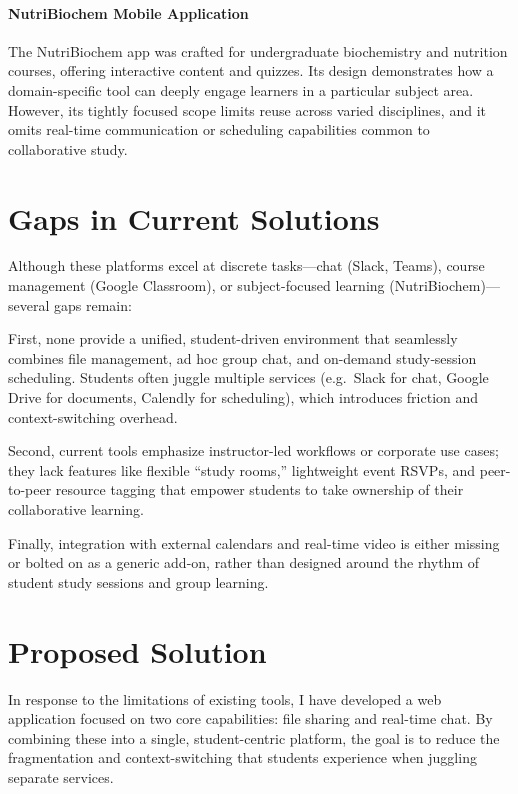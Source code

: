 \paragraph{NutriBiochem Mobile Application}\cite{NutriBiochem}  
The NutriBiochem app was crafted for undergraduate biochemistry and nutrition courses, offering interactive content and quizzes.  Its design demonstrates how a domain-specific tool can deeply engage learners in a particular subject area.  However, its tightly focused scope limits reuse across varied disciplines, and it omits real-time communication or scheduling capabilities common to collaborative study.

\section{Gaps in Current Solutions}

Although these platforms excel at discrete tasks—chat (Slack, Teams), course management (Google Classroom), or subject-focused learning (NutriBiochem)—several gaps remain:

First, none provide a unified, student-driven environment that seamlessly combines file management, ad hoc group chat, and on-demand study‐session scheduling. Students often juggle multiple services (e.g.\ Slack for chat, Google Drive for documents, Calendly for scheduling), which introduces friction and context-switching overhead.

Second, current tools emphasize instructor-led workflows or corporate use cases; they lack features like flexible “study rooms,” lightweight event RSVPs, and peer-to-peer resource tagging that empower students to take ownership of their collaborative learning.

Finally, integration with external calendars and real-time video is either missing or bolted on as a generic add-on, rather than designed around the rhythm of student study sessions and group learning.

\section{Proposed Solution}

In response to the limitations of existing tools, I have developed a web application focused on two core capabilities: file sharing and real-time chat.  By combining these into a single, student-centric platform, the goal is to reduce the fragmentation and context-switching that students experience when juggling separate services.

